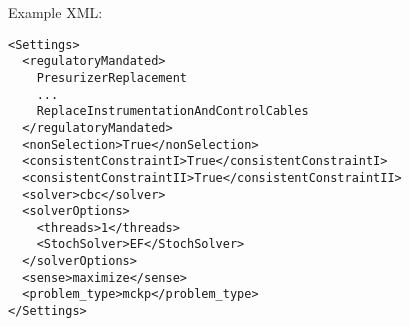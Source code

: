 Example XML:
\begin{lstlisting}[style=XML]
<Settings>
  <regulatoryMandated>
    PresurizerReplacement
    ...
    ReplaceInstrumentationAndControlCables
  </regulatoryMandated>
  <nonSelection>True</nonSelection>
  <consistentConstraintI>True</consistentConstraintI>
  <consistentConstraintII>True</consistentConstraintII>
  <solver>cbc</solver>
  <solverOptions>
    <threads>1</threads>
    <StochSolver>EF</StochSolver>
  </solverOptions>
  <sense>maximize</sense>
  <problem_type>mckp</problem_type>
</Settings>
\end{lstlisting}
